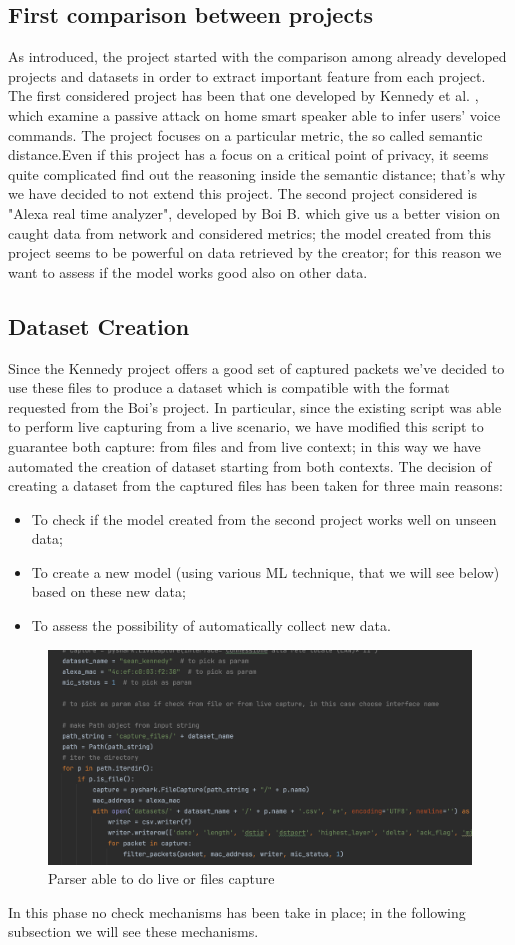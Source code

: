 \documentclass[sigconf]{acmart}
\begin{document}
\subsection{First comparison between projects}
As introduced, the project started with the comparison among already developed projects and datasets in order to extract important feature from each project. The first considered project has been that one developed by Kennedy et al. \cite{kennedy}, which examine a passive attack on home smart speaker able to infer users' voice commands. The project focuses on a particular metric, the so called semantic distance.Even if this project has a focus on a critical point of privacy, it seems  quite complicated find out the reasoning inside the semantic distance; that's why we have decided to not extend this project. The second project considered is "Alexa real time analyzer", developed by Boi B. which give us a better vision on caught data from network and considered metrics; the model created from this project seems to be powerful on data retrieved by the creator; for this reason we want to assess if the model works good also on other data.
\subsection{Dataset Creation}
Since the Kennedy project offers a good set of captured packets we've decided to use these files to produce a dataset which is compatible with the format requested from the Boi's project. In particular, since the existing script was able to perform live capturing from a live scenario, we have modified this script to guarantee both capture: from files and from live context; in this way we have automated the creation of dataset starting from both contexts.
The decision of creating a dataset from the captured files has been taken for three main reasons:
\begin{itemize}
\item To check if the model created from the second project works well on unseen data;
\item To create a new model (using various ML technique, that we will see below) based on these new data;
\item To assess the possibility of automatically collect new data.
\end{itemize}
\begin{figure}[h!]
        \includegraphics[width=0.8\linewidth]{img/parser.png}
        \caption{Parser able to do live or files capture}
        \label{fig:parser}
    \end{figure}
In this phase no check mechanisms has been take in place; in the following subsection we will see these mechanisms.
\end{document}
